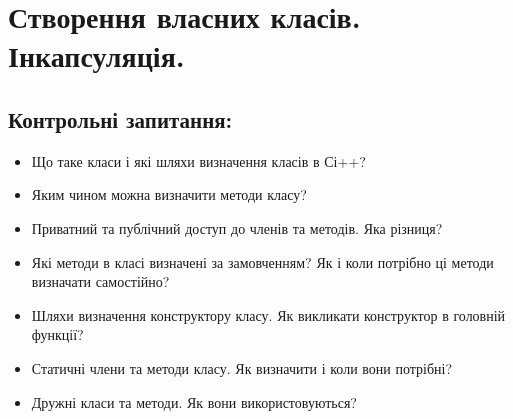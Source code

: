 \documentclass[a5paper,titlepage,openany,twoside,draft]{book_unv}%
\begin{document}
\chapter{Створення власних класів. Інкапсуляція.}
%

\section{Контрольні запитання:}
\begin{itemize}
\item
Що таке класи і які шляхи визначення класів в Сі++?
\item
Яким чином можна визначити методи класу?
\item
Приватний та публічний доступ до членів та методів. Яка різниця?
\item
Які методи в класі визначені за замовченням? Як і коли потрібно ці
методи визначати самостійно?
\item 
Шляхи визначення конструктору класу. Як викликати конструктор в
головній функції?
\item
Статичні члени та методи класу. Як визначити і коли вони потрібні?
\item 
Дружні класи та методи. Як вони використовуються?
\end{itemize}
\end{document}
